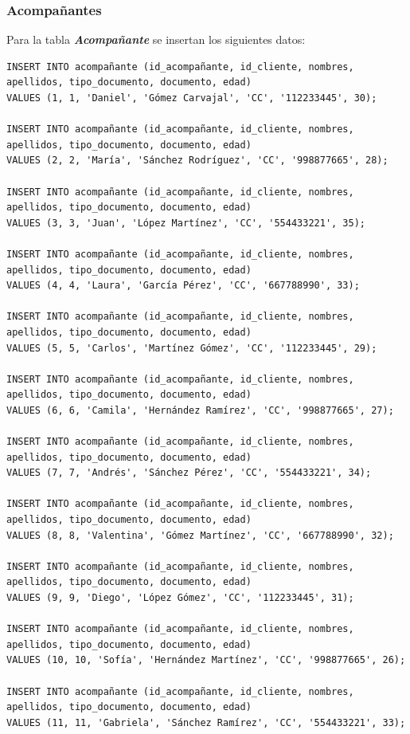 \documentclass{article}
\begin{document}
\subsubsection{Acompañantes}
Para la tabla \textit{\textbf{Acompañante}} se insertan los siguientes datos:
\begin{lstlisting}
INSERT INTO acompañante (id_acompañante, id_cliente, nombres, apellidos, tipo_documento, documento, edad)
VALUES (1, 1, 'Daniel', 'Gómez Carvajal', 'CC', '112233445', 30);

INSERT INTO acompañante (id_acompañante, id_cliente, nombres, apellidos, tipo_documento, documento, edad)
VALUES (2, 2, 'María', 'Sánchez Rodríguez', 'CC', '998877665', 28);

INSERT INTO acompañante (id_acompañante, id_cliente, nombres, apellidos, tipo_documento, documento, edad)
VALUES (3, 3, 'Juan', 'López Martínez', 'CC', '554433221', 35);

INSERT INTO acompañante (id_acompañante, id_cliente, nombres, apellidos, tipo_documento, documento, edad)
VALUES (4, 4, 'Laura', 'García Pérez', 'CC', '667788990', 33);

INSERT INTO acompañante (id_acompañante, id_cliente, nombres, apellidos, tipo_documento, documento, edad)
VALUES (5, 5, 'Carlos', 'Martínez Gómez', 'CC', '112233445', 29);

INSERT INTO acompañante (id_acompañante, id_cliente, nombres, apellidos, tipo_documento, documento, edad)
VALUES (6, 6, 'Camila', 'Hernández Ramírez', 'CC', '998877665', 27);

INSERT INTO acompañante (id_acompañante, id_cliente, nombres, apellidos, tipo_documento, documento, edad)
VALUES (7, 7, 'Andrés', 'Sánchez Pérez', 'CC', '554433221', 34);

INSERT INTO acompañante (id_acompañante, id_cliente, nombres, apellidos, tipo_documento, documento, edad)
VALUES (8, 8, 'Valentina', 'Gómez Martínez', 'CC', '667788990', 32);

INSERT INTO acompañante (id_acompañante, id_cliente, nombres, apellidos, tipo_documento, documento, edad)
VALUES (9, 9, 'Diego', 'López Gómez', 'CC', '112233445', 31);

INSERT INTO acompañante (id_acompañante, id_cliente, nombres, apellidos, tipo_documento, documento, edad)
VALUES (10, 10, 'Sofía', 'Hernández Martínez', 'CC', '998877665', 26);

INSERT INTO acompañante (id_acompañante, id_cliente, nombres, apellidos, tipo_documento, documento, edad)
VALUES (11, 11, 'Gabriela', 'Sánchez Ramírez', 'CC', '554433221', 33);


\end{lstlisting}
\end{document}
